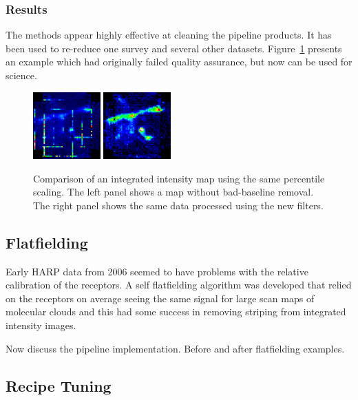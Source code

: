 \documentclass[final,authoryear,5p,times,twocolumn]{elsarticle}
\begin{document}
\subsubsection{Results}

The methods appear highly effective at cleaning the pipeline
products. It has been used to re-reduce one survey and several other
datasets. Figure~\ref{fig:badbase:results} presents an example which
had originally failed quality assurance, but now can be used for
science.

\begin{figure}
\includegraphics[width=0.23\textwidth]{P61_f3a}
\includegraphics[width=0.23\textwidth]{P61_f3b}
\caption{Comparison of an integrated intensity map using the same
  percentile scaling.  The left panel shows a map without bad-baseline
  removal.  The right panel shows the same data processed using the
  new filters.}
\label{fig:badbase:results}
\end{figure}

\subsection{Flatfielding}

Early HARP data from 2006 seemed to have problems with the relative
calibration of the receptors. A self flatfielding algorithm was
developed that relied on the receptors on average seeing the same
signal for large scan maps of molecular clouds
\citep{2010MNRAS.401..455C} and this had some success in removing
striping from integrated intensity images.

Now discuss the pipeline implementation. Before and after flatfielding examples.

\subsection{Recipe Tuning}
\end{document}
